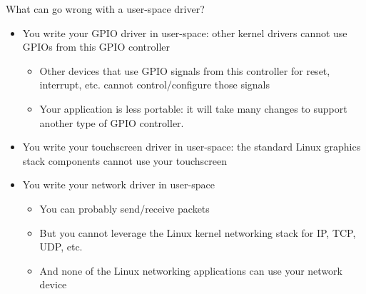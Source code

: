 \begin{frame}{What can go wrong with a user-space driver?}
  \begin{itemize}
  \item You write your GPIO driver in user-space: other kernel drivers
    cannot use GPIOs from this GPIO controller
    \begin{itemize}
    \item Other devices that use GPIO signals from this controller for reset, interrupt, etc. cannot control/configure those signals
    \item Your application is less portable: it will take many changes to support another type of GPIO controller.
    \end{itemize}
  \item You write your touchscreen driver in user-space: the standard
    Linux graphics stack components cannot use your touchscreen
  \item You write your network driver in user-space
    \begin{itemize}
    \item You can probably send/receive packets
    \item But you cannot leverage the Linux kernel networking stack
      for IP, TCP, UDP, etc.
    \item And none of the Linux networking applications can use your
      network device
    \end{itemize}
  \end{itemize}
\end{frame}

